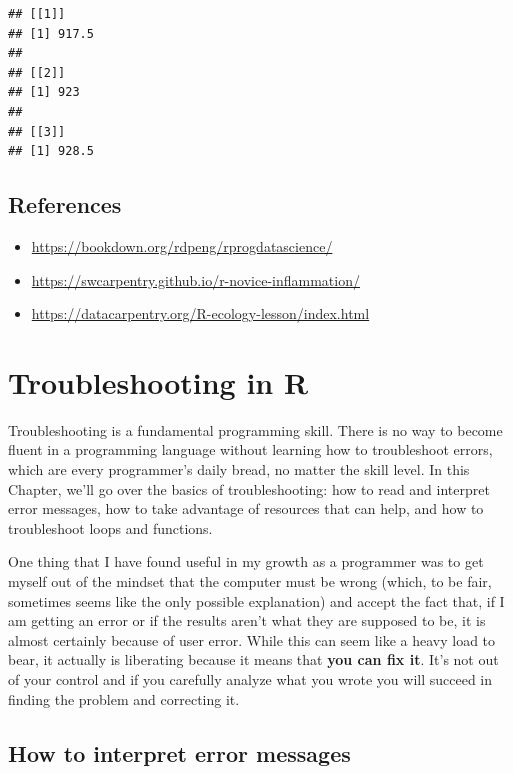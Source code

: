 \documentclass[
]{book}
\providecommand{\tightlist}{%
  \setlength{\itemsep}{0pt}\setlength{\parskip}{0pt}}
\begin{document}
\begin{verbatim}
## [[1]]
## [1] 917.5
## 
## [[2]]
## [1] 923
## 
## [[3]]
## [1] 928.5
\end{verbatim}

\hypertarget{references-5}{%
\section{References}\label{references-5}}

\begin{itemize}
\tightlist
\item
  \url{https://bookdown.org/rdpeng/rprogdatascience/}
\item
  \url{https://swcarpentry.github.io/r-novice-inflammation/}
\item
  \url{https://datacarpentry.org/R-ecology-lesson/index.html}
\end{itemize}

\hypertarget{troubleshooting}{%
\chapter{Troubleshooting in R}\label{troubleshooting}}

Troubleshooting is a fundamental programming skill. There is no way to become
fluent in a programming language without learning how to troubleshoot errors,
which are every programmer's daily bread, no matter the skill level. In this
Chapter, we'll go over the basics of troubleshooting: how to read and interpret
error messages, how to take advantage of resources that can help, and how to
troubleshoot loops and functions.

One thing that I have found useful in my growth as a programmer was to get
myself out of the mindset that the computer must be wrong (which, to be fair,
sometimes seems like the only possible explanation) and accept the fact that, if
I am getting an error or if the results aren't what they are supposed to be, it
is almost certainly because of user error. While this can seem like a heavy load
to bear, it actually is liberating because it means that \textbf{you can fix it}.
It's not out of your control and if you carefully analyze what you wrote you
will succeed in finding the problem and correcting it.

\hypertarget{how-to-interpret-error-messages}{%
\section{How to interpret error messages}\label{how-to-interpret-error-messages}}
\end{document}
